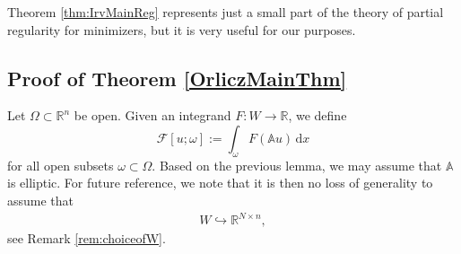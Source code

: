 \documentclass[a4paper,11pt]{amsart}
\numberwithin{equation}{section}
\newcommand{\R}{\mathbb{R}}
\begin{document}
	Theorem \ref{thm:IrvMainReg} represents just a small part of the theory of partial regularity for minimizers, but it is very useful for our purposes.
	\subsection{Proof of Theorem \ref{OrliczMainThm}}
	Let $\Omega \subset \mathbb{R}^n$ be open. Given an integrand $F: W \to \mathbb{R}$, we define
	\[
	\mathcal{F}[u;\omega] := \int_\omega F(\mathbb{A}u) \, \mathrm{d}x
	\]
	for all open subsets $\omega \subset \Omega$. 
	Based on the previous lemma, we may assume that $\mathbb{A}$ is elliptic. For future reference, we note that it is then no loss of generality to assume that 
	\begin{align}\label{eq:embass}
		W\hookrightarrow \R^{N\times n}, 
	\end{align}
	see Remark \ref{rem:choiceofW}. 
	
\end{document}
